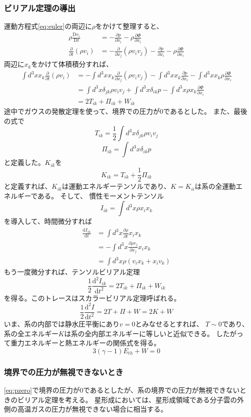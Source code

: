 \documentclass{jsarticle}
\newcommand{\pder}[2][]{\frac{\partial#1}{\partial#2}}
\newcommand{\dder}[2][]{\frac{\mathrm{d}#1}{\mathrm{d}#2}}
\newcommand{\ddder}[2][]{\frac{\mathrm{d^2}#1}{\mathrm{d}#2^2}}
\newcommand{\Dder}[2][]{\frac{\mathrm{D}#1}{\mathrm{D}#2}}
\newcommand{\half}{\frac{1}{2}}
\newcommand{\ethe}{E_{th}}
\newcommand{\beq}{\begin{equation}}
\newcommand{\eeq}{\end{equation}}
\begin{document}
\subsubsection{ビリアル定理の導出}
運動方程式\eqref{eq:euler}の両辺に$\rho$をかけて整理すると、
\begin{align}
    \rho\Dder[v_i]{t} &= - \pder[p]{x_i} - \rho\pder[\Phi]{x_i}\\
    \pder[]{t}(\rho v_i) &= - \pder[]{x_j}(\rho v_iv_j) - \pder[p]{x_i} - \rho\pder[\Phi]{x_i}
\end{align}
両辺に$x_k$をかけて体積積分すれば、
\begin{align}
    \int d^3x x_k \pder[]{t}(\rho v_i) &= - \int d^3x x_k\pder[]{x_j}(\rho v_iv_j) - \int d^3x x_k\pder[p]{x_i} - \int d^3x x_k\rho\pder[\Phi]{x_i}\\
                                       &=  \int d^3x \delta_{jk}\rho v_iv_j + \int d^3x \delta_{ik}p - \int d^3x \rho x_k\pder[\Phi]{x_i}\label{eq:pzero}\\
                                       &= 2T_{ik} + \Pi_{ik} + W_{ik}
\end{align}
途中でガウスの発散定理を使って、境界での圧力が$0$であるとした。
また、最後の式で
\beq
T_{ik} = \half\int d^3x \delta_{jk}\rho v_iv_j
\eeq
\beq
 \Pi_{ik} =  \int d^3x \delta_{ik}p
\eeq
と定義した。$K_{ik}$を
\beq
K_{ik} = T_{ik} + \half\Pi_{ik}
\eeq
と定義すれば、$K_{ik}$は運動エネルギーテンソルであり、$K = K_{ii}$は系の全運動エネルギーである。
そして、
慣性モーメントテンソル
\beq
    I_{ik} = \int d^3x\rho x_i x_k 
\eeq
を導入して、時間微分すれば
\begin{align}
    \dder[I_{ik}]{t} &= \int d^3x \pder[\rho]{t} x_i x_k \\
                     &= -\int d^3x \pder[\rho v_j]{x_j} x_i x_k\\
                     &= \int d^3x \rho(v_ix_k + x_i v_k)
\end{align}
もう一度微分すれば、テンソルビリアル定理
\beq
\half \ddder[I_{ik}]{t} = 2T_{ik} + \Pi_{ik} + W_{ik}
\eeq
を得る。このトレースはスカラービリアル定理呼ばれる。
\beq
\half \ddder[I]{t} = 2T + \Pi + W = 2K + W
\eeq
いま、系の内部では静水圧平衡にあり$v=0$とみなせるとすれば、
$T \sim 0$であり、
系の全エネルギー$K$は系の全内部エネルギーに等しいと近似できる。
したがって重力エネルギーと熱エネルギーの関係式を得る。
\beq
    3(\gamma -1)\ethe + W = 0
\eeq
\subsubsection{境界での圧力が無視できないとき}
\eqref{eq:pzero}で境界の圧力が0であるとしたが、系の境界での圧力が無視できないときのビリアル定理を考える。
星形成においては、星形成領域である分子雲の外側の高温ガスの圧力が無視できない場合に相当する。
\end{document}
